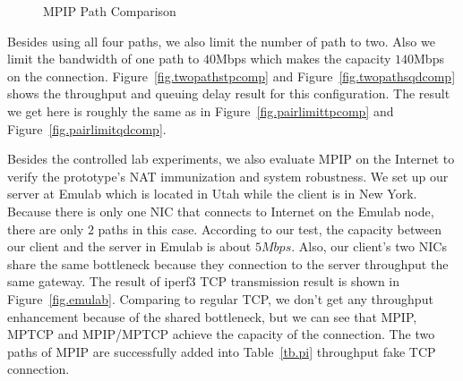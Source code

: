 \begin{figure}[htb]
{
}
\caption{MPIP Path Comparison}
\label{fig.mpip_path}
\end{figure}

Besides using all four paths, we also limit the number of path to two. Also we limit the bandwidth of one path to $40$Mbps which makes the capacity $140$Mbps on the connection. Figure~\ref{fig.twopathstpcomp} and Figure~\ref{fig.twopathsqdcomp} shows the throughput and queuing delay result for this configuration. The result we get here is roughly the same as in Figure~\ref{fig.pairlimittpcomp} and Figure~\ref{fig.pairlimitqdcomp}.


Besides the controlled lab experiments, we also evaluate MPIP on the Internet to verify the prototype's NAT immunization and system robustness. We set up our server at Emulab\cite{emulab} which is located in Utah while the client is in New York. Because there is only one NIC that connects to Internet on the Emulab node, there are only $2$ paths in this case. According to our test, the capacity between our client and the server in Emulab is about $5Mbps$. Also, our client's two NICs share the same bottleneck because they connection to the server throughput the same gateway. The result of iperf3 TCP transmission result is shown in Figure~\ref{fig.emulab}. Comparing to regular TCP, we don't get any throughput enhancement because of the shared bottleneck, but we can see that MPIP, MPTCP and MPIP/MPTCP achieve the capacity of the connection. The two paths of MPIP are successfully added into Table~\ref{tb.pi} throughput fake TCP connection. 


